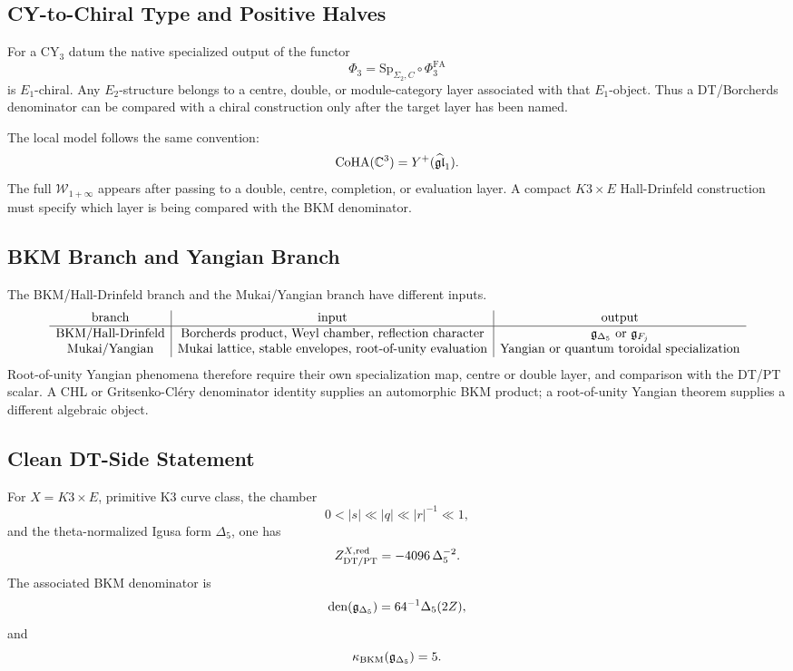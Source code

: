 \subsection{CY-to-Chiral Type and Positive Halves}
\label{subsec:cy-to-chiral-type}

For a CY$_3$ datum the native specialized output of the functor
\[
        \Phi_3=\mathrm{Sp}_{\Sigma_2,C}\circ\Phi^{\mathrm{FA}}_3
\]
is \(E_1\)-chiral.  Any \(E_2\)-structure belongs to a centre, double,
or module-category layer associated with that \(E_1\)-object.  Thus a
DT/Borcherds denominator can be compared with a chiral construction
only after the target layer has been named.

The local model follows the same convention:
\[
        \mathrm{CoHA}(\mathbb{C}^3)=Y^+(\widehat{\mathfrak{gl}}_1).
\]
The full \(\mathcal W_{1+\infty}\) appears after passing to a double,
centre, completion, or evaluation layer.  A compact \(K3\times E\)
Hall-Drinfeld construction must specify which layer is being compared
with the BKM denominator.

\subsection{BKM Branch and Yangian Branch}
\label{subsec:bkm-yangian-branches}

The BKM/Hall-Drinfeld branch and the Mukai/Yangian branch have
different inputs.
\[
\begin{array}{c|c|c}
\text{branch} & \text{input} & \text{output}\\
\hline
\text{BKM/Hall-Drinfeld} &
\text{Borcherds product, Weyl chamber, reflection character} &
\mathfrak{g}_{\Delta_5}\text{ or }\mathfrak{g}_{F_j}\\
\text{Mukai/Yangian} &
\text{Mukai lattice, stable envelopes, root-of-unity evaluation} &
\text{Yangian or quantum toroidal specialization}
\end{array}
\]
Root-of-unity Yangian phenomena therefore require their own
specialization map, centre or double layer, and comparison with the
DT/PT scalar.  A CHL or Gritsenko-Cl\'ery denominator identity supplies
an automorphic BKM product; a root-of-unity Yangian theorem supplies a
different algebraic object.

\subsection{Clean DT-Side Statement}
\label{subsec:clean-dt-side-statement}

\begin{theorem}
\label{thm:clean-dt-side-n1}
For \(X=K3\times E\), primitive K3 curve class, the chamber
\[
        0<|s|\ll |q|\ll |r|^{-1}\ll1,
\]
and the theta-normalized Igusa form \(\Delta_5\), one has
\[
        Z^{X,\mathrm{red}}_{\mathrm{DT}/\mathrm{PT}}
        =
        -4096\,\Delta_5^{-2}.
\]
The associated BKM denominator is
\[
        \operatorname{den}(\mathfrak{g}_{\Delta_5})=64^{-1}\Delta_5(2Z),
\]
and
\[
        \kappa_{\mathrm{BKM}}(\mathfrak{g}_{\Delta_5})=5.
\]
\end{theorem}


